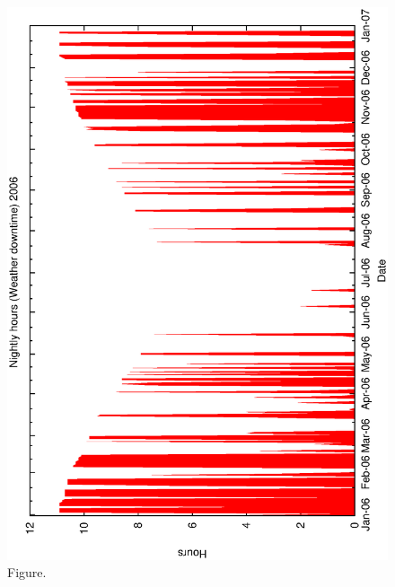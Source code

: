 \documentclass[12pt,a4paper]{article}
\begin{document}
\begin{figure}[htbp]
 \begin{center}
  \includegraphics[scale=1.0, angle=0]{figures/met_nightly_stats_weather2006.eps}
 \end{center}
  \caption[Figure.]
{Figure.}
\end{figure}
\clearpage
\end{document}
